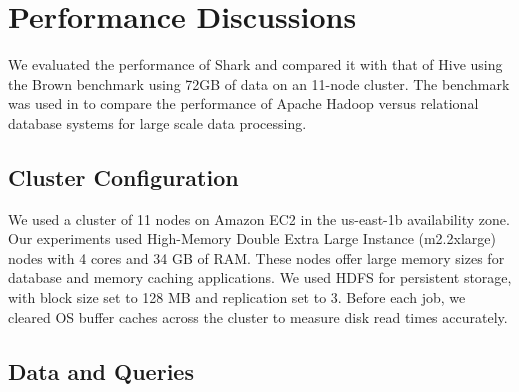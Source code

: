 
\section{Performance Discussions}



We evaluated the performance of Shark and compared it with that of Hive using the Brown benchmark using 72GB of data on an 11-node cluster. The benchmark was used in \cite{pavlo2009comparison} to compare the performance of Apache Hadoop versus relational database systems for large scale data processing.


\subsection{Cluster Configuration}
We used a cluster of 11 nodes on Amazon EC2 in the us-east-1b availability zone. Our experiments used High-Memory Double Extra Large Instance (m2.2xlarge) nodes with 4 cores and 34 GB of RAM. These nodes offer large memory sizes for database and memory caching applications. We used HDFS for persistent storage, with block size set to 128 MB and replication set to 3. Before each job, we cleared OS buffer caches across the cluster to measure disk read times accurately.


\subsection{Data and Queries}


